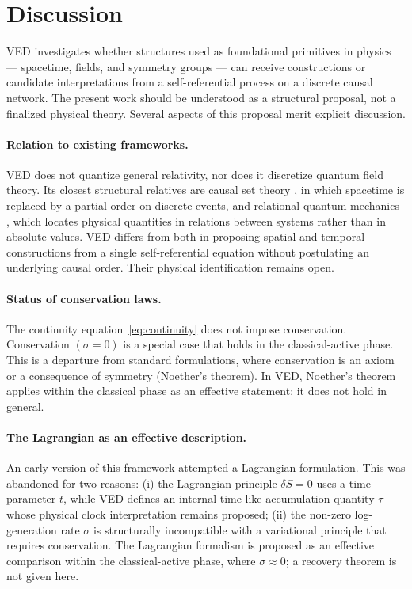 \section{Discussion}
\label{sec:discussion}

VED investigates whether structures used as foundational primitives in physics
--- spacetime, fields, and symmetry groups --- can receive constructions or
candidate interpretations from a self-referential process on a discrete causal
network.
The present work should be understood as a structural proposal, not a finalized physical theory.
Several aspects of this proposal merit explicit discussion.

\paragraph{Relation to existing frameworks.}
VED does not quantize general relativity, nor does it discretize
quantum field theory.
Its closest structural relatives are causal set theory
\cite{bombelli1987causal,sorkin2005causal},
in which spacetime is replaced by a partial order on discrete events,
and relational quantum mechanics \cite{rovelli1996relational},
which locates physical quantities in relations between systems rather
than in absolute values.
VED differs from both in proposing spatial and temporal constructions from a
single self-referential equation without postulating an underlying causal
order. Their physical identification remains open.

\paragraph{Status of conservation laws.}
The continuity equation~\cref{eq:continuity} does not impose conservation.
Conservation $(\sigma = 0)$ is a special case that holds in the
classical-active phase.
This is a departure from standard formulations, where conservation is
an axiom or a consequence of symmetry (Noether's theorem).
In VED, Noether's theorem applies within the classical phase as an
effective statement; it does not hold in general.

\paragraph{The Lagrangian as an effective description.}
An early version of this framework attempted a Lagrangian formulation.
This was abandoned for two reasons:
(i) the Lagrangian principle $\delta S = 0$ uses a time parameter $t$, while
VED defines an internal time-like accumulation quantity $\tau$ whose physical
clock interpretation remains proposed;
(ii) the non-zero log-generation rate $\sigma$ is structurally
incompatible with a variational principle that requires conservation.
The Lagrangian formalism is proposed as an effective comparison within the
classical-active phase, where $\sigma \approx 0$; a recovery theorem is not
given here.

